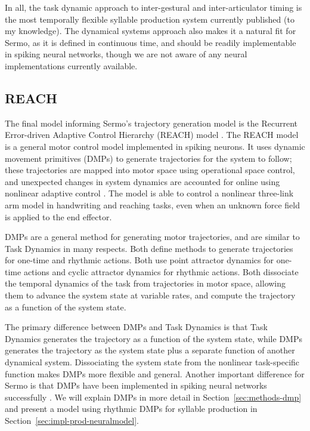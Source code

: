 In all, the task dynamic approach
to inter-gestural and inter-articulator timing
is the most temporally flexible
syllable production system
currently published
(to my knowledge).
The dynamical systems approach
also makes it a natural fit for Sermo,
as it is defined in continuous time,
and should be readily implementable
in spiking neural networks,
though we are not aware of any
neural implementations currently available.

\subsection{REACH}

The final model informing
Sermo's trajectory generation model is the
Recurrent Error-driven Adaptive Control Hierarchy (REACH)
model \citep{dewolf2015}.
The REACH model is a general motor control
model implemented in spiking neurons.
It uses dynamic movement primitives (DMPs)
to generate trajectories
for the system to follow;
these trajectories are mapped into
motor space using operational space control,
and unexpected changes in system dynamics
are accounted for online
using nonlinear adaptive control
\citep{slotine1987}.
The model is able to control
a nonlinear three-link arm model
in handwriting and reaching tasks,
even when an unknown force field
is applied to the end effector.

DMPs are a general method for generating motor trajectories,
and are similar to Task Dynamics in many respects.
Both define methods to generate trajectories
for one-time and rhythmic actions.
Both use point attractor dynamics
for one-time actions
and cyclic attractor dynamics
for rhythmic actions.
Both dissociate the temporal dynamics
of the task from trajectories
in motor space,
allowing them to advance the system state
at variable rates,
and compute the trajectory
as a function of the system state.

The primary difference between DMPs and Task Dynamics
is that Task Dynamics generates
the trajectory as a function
of the system state,
while DMPs generates the trajectory
as the system state
plus a separate function
of another dynamical system.
Dissociating the system state
from the nonlinear task-specific function
makes DMPs more flexible and general.
Another important difference for Sermo
is that DMPs have been implemented
in spiking neural networks successfully
\citep{dewolf2015}.
We will explain DMPs in more detail
in Section~\ref{sec:methods-dmp} and present a model
using rhythmic DMPs for syllable production
in Section~\ref{sec:impl-prod-neuralmodel}.

